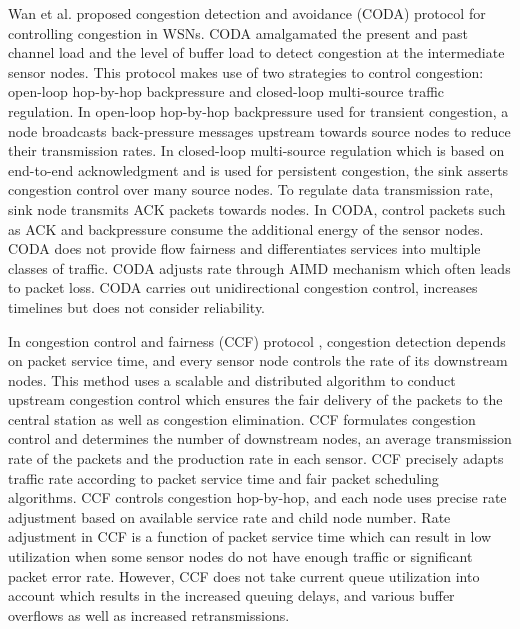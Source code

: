 Wan et al. \cite{Wan:2003:CCD:958491.958523} proposed congestion detection and avoidance (CODA) protocol for controlling congestion in WSNs. CODA amalgamated the present and past channel load and the level of buffer load to detect congestion at the intermediate sensor nodes. This protocol makes use of two strategies to control congestion: open-loop hop-by-hop backpressure and closed-loop multi-source traffic regulation. In open-loop hop-by-hop backpressure used for transient congestion, a node broadcasts back-pressure messages upstream towards source nodes to reduce their transmission rates. In closed-loop multi-source regulation which is based on end-to-end acknowledgment
and is used for persistent congestion, the sink asserts congestion control over many source nodes. To regulate data transmission rate, sink node transmits ACK packets towards nodes. In CODA, control packets such as ACK and backpressure consume the additional energy of the sensor nodes. CODA does not provide flow fairness and differentiates services into multiple classes of traffic. CODA adjusts rate through AIMD mechanism which often leads to packet loss. CODA carries out unidirectional congestion control, increases timelines but does not consider reliability. 

In congestion control and fairness (CCF) protocol \cite{Ee:2004:CCF:1031495.1031513}, congestion detection depends on packet service time, and every sensor node controls the rate of its downstream nodes. This method uses a scalable and distributed algorithm to conduct upstream congestion control which ensures the fair delivery of the packets to the central station as well as congestion elimination. CCF formulates congestion control and determines the number of downstream nodes, an average transmission rate of the packets and the production rate in each sensor. CCF precisely adapts traffic rate according to packet service time and fair packet scheduling algorithms. CCF controls congestion hop-by-hop, and each node uses precise rate adjustment based on available service rate and child node number. Rate adjustment in CCF is a function of packet service time which can result in low utilization when some sensor nodes do not have enough traffic or significant packet error rate. However, CCF does not take current queue utilization into account which results in the increased queuing delays, and various buffer overflows as well as increased retransmissions.


